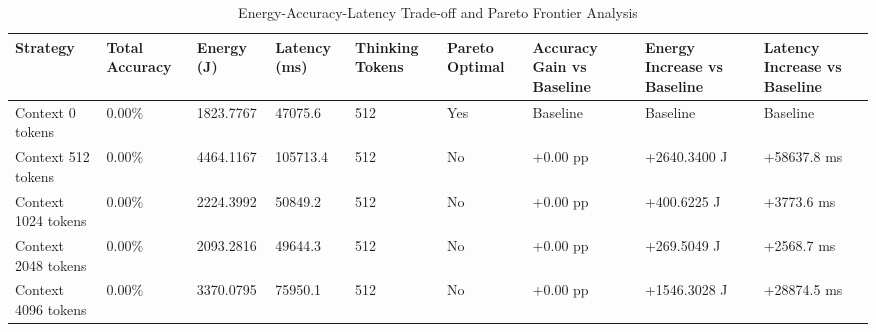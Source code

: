 \begin{table}
\caption{Energy-Accuracy-Latency Trade-off and Pareto Frontier Analysis}
\label{tab:tradeoff_comparison}
\begin{tabular}{lllllllll}
\toprule
Strategy & Total Accuracy & Energy (J) & Latency (ms) & Thinking Tokens & Pareto Optimal & Accuracy Gain vs Baseline & Energy Increase vs Baseline & Latency Increase vs Baseline \\
\midrule
Context 0 tokens & 0.00\% & 1823.7767 & 47075.6 & 512 & Yes & Baseline & Baseline & Baseline \\
Context 512 tokens & 0.00\% & 4464.1167 & 105713.4 & 512 & No & +0.00 pp & +2640.3400 J & +58637.8 ms \\
Context 1024 tokens & 0.00\% & 2224.3992 & 50849.2 & 512 & No & +0.00 pp & +400.6225 J & +3773.6 ms \\
Context 2048 tokens & 0.00\% & 2093.2816 & 49644.3 & 512 & No & +0.00 pp & +269.5049 J & +2568.7 ms \\
Context 4096 tokens & 0.00\% & 3370.0795 & 75950.1 & 512 & No & +0.00 pp & +1546.3028 J & +28874.5 ms \\
\bottomrule
\end{tabular}
\end{table}
